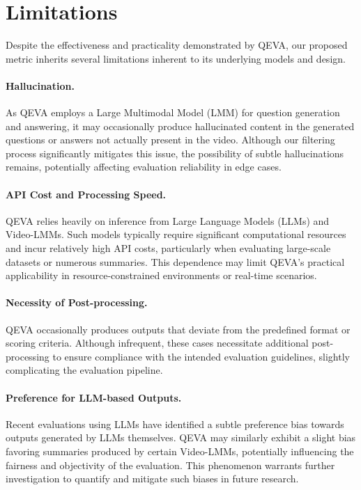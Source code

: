 \section*{Limitations}

Despite the effectiveness and practicality demonstrated by QEVA, our proposed metric inherits several limitations inherent to its underlying models and design.

\paragraph{Hallucination.} 
As QEVA employs a Large Multimodal Model (LMM) for question generation and answering, it may occasionally produce hallucinated content in the generated questions or answers not actually present in the video. Although our filtering process significantly mitigates this issue, the possibility of subtle hallucinations remains, potentially affecting evaluation reliability in edge cases.

\paragraph{API Cost and Processing Speed.}
QEVA relies heavily on inference from Large Language Models (LLMs) and Video-LMMs. Such models typically require significant computational resources and incur relatively high API costs, particularly when evaluating large-scale datasets or numerous summaries. This dependence may limit QEVA's practical applicability in resource-constrained environments or real-time scenarios.

\paragraph{Necessity of Post-processing.}
QEVA occasionally produces outputs that deviate from the predefined format or scoring criteria. Although infrequent, these cases necessitate additional post-processing to ensure compliance with the intended evaluation guidelines, slightly complicating the evaluation pipeline.

\paragraph{Preference for LLM-based Outputs.}
Recent evaluations using LLMs have identified a subtle preference bias towards outputs generated by LLMs themselves. QEVA may similarly exhibit a slight bias favoring summaries produced by certain Video-LMMs, potentially influencing the fairness and objectivity of the evaluation. This phenomenon warrants further investigation to quantify and mitigate such biases in future research.

